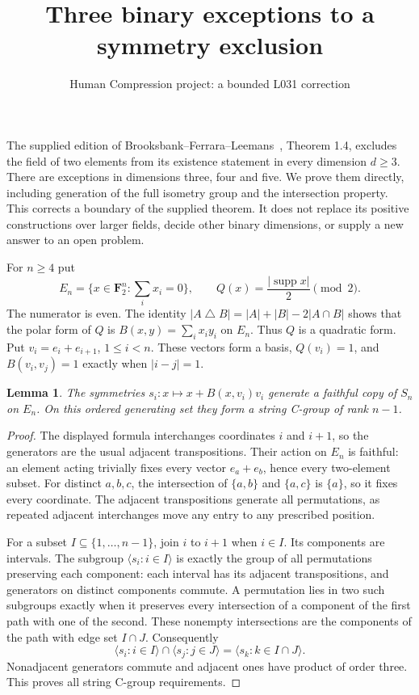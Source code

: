 \documentclass[11pt,a4paper]{article}
\title{Three binary exceptions to a symmetry exclusion}
\author{Human Compression project: a bounded L031 correction}
\date{}
\newtheorem{lemma}{Lemma}
\newcommand{\gen}[1]{\langle#1\rangle}
\begin{document}
\maketitle
The supplied edition of Brooksbank--Ferrara--Leemans~\cite{BFL},
Theorem 1.4, excludes the field of two elements from its existence
statement in every dimension $d\geq3$. There are exceptions in
dimensions three, four and five. We prove them directly, including
generation of the full isometry group and the intersection property.
This corrects a boundary of the supplied theorem. It does not replace
its positive constructions over larger fields, decide other binary
dimensions, or supply a new answer to an open problem.

For $n\geq4$ put
\[
 E_n=\{x\in\mathbf F_2^n:\textstyle\sum_i x_i=0\},\qquad
 Q(x)=\frac{|\operatorname{supp}x|}{2}\pmod2.
\]
The numerator is even. The identity
$|A\mathbin\triangle B|=|A|+|B|-2|A\cap B|$ shows that the
polar form of $Q$ is $B(x,y)=\sum_i x_i y_i$ on $E_n$.
Thus $Q$ is a quadratic form. Put $v_i=e_i+e_{i+1}$,
$1\leq i<n$. These vectors form a basis, $Q(v_i)=1$, and
$B(v_i,v_j)=1$ exactly when $|i-j|=1$.

\begin{lemma}\label{path}
The symmetries $s_i:x\mapsto x+B(x,v_i)v_i$ generate a
faithful copy of $S_n$ on $E_n$. On this ordered generating set
they form a string C-group of rank $n-1$.
\end{lemma}
\begin{proof}
The displayed formula interchanges coordinates $i$ and $i+1$,
so the generators are the usual adjacent transpositions. Their
action on $E_n$ is faithful: an element acting trivially fixes
every vector $e_a+e_b$, hence every two-element subset. For
distinct $a,b,c$, the intersection of $\{a,b\}$ and $\{a,c\}$
is $\{a\}$, so it fixes every coordinate. The adjacent
transpositions generate all permutations, as repeated adjacent
interchanges move any entry to any prescribed position.

For a subset $I\subseteq\{1,\ldots,n-1\}$, join $i$ to $i+1$
when $i\in I$. Its components are intervals. The subgroup
$\gen{s_i:i\in I}$ is exactly the group of all permutations
preserving each component: each interval has its adjacent
transpositions, and generators on distinct components commute.
A permutation lies in two such subgroups exactly when it
preserves every intersection of a component of the first path
with one of the second. These nonempty intersections are the
components of the path with edge set $I\cap J$. Consequently
\[
 \gen{s_i:i\in I}\cap\gen{s_j:j\in J}
       =\gen{s_k:k\in I\cap J}.
\]
Nonadjacent generators commute and adjacent ones have product
of order three. This proves all string C-group requirements.
\end{proof}
\end{document}
